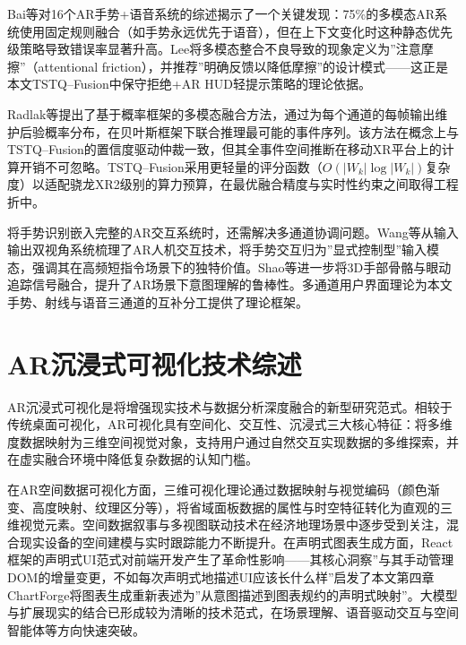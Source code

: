 Bai等\cite{bai2025ar_gesture_speech}对16个AR手势+语音系统的综述揭示了一个关键发现：75\%的多模态AR系统使用固定规则融合（如手势永远优先于语音），但在上下文变化时这种静态优先级策略导致错误率显著升高。Lee\cite{lee2025attentional_friction}将多模态整合不良导致的现象定义为”注意摩擦”（attentional friction），并推荐”明确反馈以降低摩擦”的设计模式——这正是本文TSTQ--Fusion中保守拒绝+AR HUD轻提示策略的理论依据。

Radlak等\cite{radlak2025probabilistic_fusion}提出了基于概率框架的多模态融合方法，通过为每个通道的每帧输出维护后验概率分布，在贝叶斯框架下联合推理最可能的事件序列。该方法在概念上与TSTQ--Fusion的置信度驱动仲裁一致，但其全事件空间推断在移动XR平台上的计算开销不可忽略。TSTQ--Fusion采用更轻量的评分函数（$O(|W_k|\log|W_k|)$复杂度）以适配骁龙XR2级别的算力预算，在最优融合精度与实时性约束之间取得工程折中。

将手势识别嵌入完整的AR交互系统时，还需解决多通道协调问题。Wang等\cite{wang2026ar_io_survey}从输入输出双视角系统梳理了AR人机交互技术，将手势交互归为”显式控制型”输入模态，强调其在高频短指令场景下的独特价值。Shao等\cite{shao2024cv_gesture}进一步将3D手部骨骼与眼动追踪信号融合，提升了AR场景下意图理解的鲁棒性。多通道用户界面理论\cite{dong2022}为本文手势、射线与语音三通道的互补分工提供了理论框架。

\section{AR沉浸式可视化技术综述}
\label{sec:ch2_vis_survey}

AR沉浸式可视化是将增强现实技术与数据分析深度融合的新型研究范式。相较于传统桌面可视化，AR可视化具有空间化、交互性、沉浸式三大核心特征：将多维度数据映射为三维空间视觉对象，支持用户通过自然交互实现数据的多维探索，并在虚实融合环境中降低复杂数据的认知门槛\cite{liu2025can,chen2025immersive_econ}。

在AR空间数据可视化方面，三维可视化理论通过数据映射与视觉编码（颜色渐变、高度映射、纹理区分等），将省域面板数据的属性与时空特征转化为直观的三维视觉元素\cite{Liu_Jia_Nie_Rosenberg_Interrante_Zhu-Tian_2025}。空间数据叙事与多视图联动技术\cite{chen2025immersive_econ}在经济地理场景中逐步受到关注，混合现实设备的空间建模与实时跟踪能力不断提升\cite{panzeri2026cartographic,siriborvornratanakul2024ar_vr_review}。在声明式图表生成方面，React框架的声明式UI范式\cite{walke2013react}对前端开发产生了革命性影响——其核心洞察”与其手动管理DOM的增量变更，不如每次声明式地描述UI应该长什么样”启发了本文第四章ChartForge将图表生成重新表述为”从意图描述到图表规约的声明式映射”。大模型与扩展现实的结合已形成较为清晰的技术范式\cite{wang2026ar_io_survey,li2025llm_ar_fusion}，在场景理解、语音驱动交互与空间智能体等方向快速突破。


